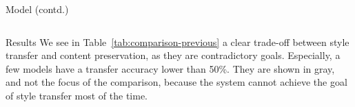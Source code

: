 \documentclass[final]{beamer}
\newlength{\onecolwid}
\newlength{\twocolwid}
\begin{document}
\begin{frame}[t]
\begin{columns}[t]
\begin{column}{\twocolwid}
\begin{columns}[t,totalwidth=\twocolwid]
\begin{column}{\onecolwid}
\begin{block}{Model (contd.)}
                    \end{block}


                \end{column} %

            \end{columns} %






            \begin{columns}[t,totalwidth=\twocolwid] %

                \begin{column}{\onecolwid} %


                    \begin{block}{Results}
                        We see in Table~\ref{tab:comparison-previous} a clear trade-off between style transfer and content preservation, as they are contradictory goals. Especially, a few models have a transfer accuracy lower than 50\%. They are shown in gray, and not the focus of the comparison, because the system cannot achieve the goal of style transfer most of the time.


\end{block}
\end{column}
\end{columns}
\end{column}
\end{columns}
\end{frame}
\end{document}
